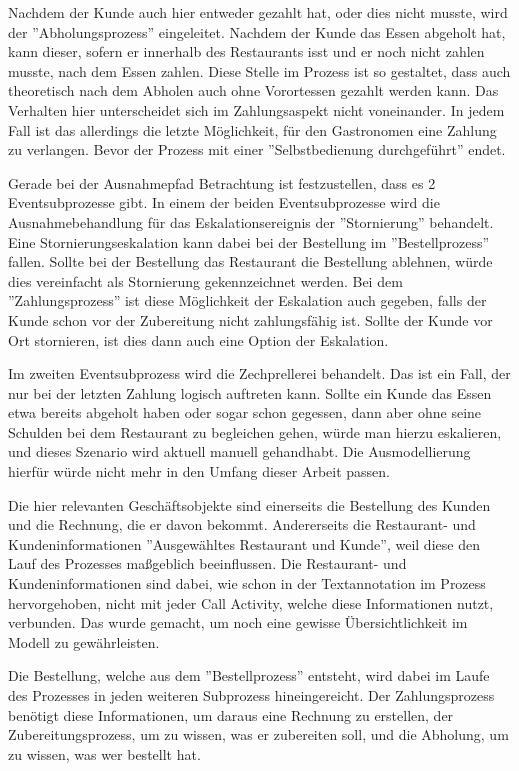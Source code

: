 Nachdem der Kunde auch hier entweder gezahlt hat, oder dies nicht musste, wird der ''Abholungsprozess'' eingeleitet. Nachdem der Kunde das Essen abgeholt hat, kann dieser, sofern er innerhalb des Restaurants isst und er noch nicht zahlen musste, nach dem Essen zahlen. Diese Stelle im Prozess ist so gestaltet, dass auch theoretisch nach dem Abholen auch ohne Vorortessen gezahlt werden kann. Das Verhalten hier unterscheidet sich im Zahlungsaspekt nicht voneinander. In jedem Fall ist das allerdings die letzte Möglichkeit, für den Gastronomen eine Zahlung zu verlangen. Bevor der Prozess mit einer ''Selbstbedienung durchgeführt'' endet.

Gerade bei der Ausnahmepfad Betrachtung ist festzustellen, dass es 2 Eventsubprozesse gibt. In einem der beiden Eventsubprozesse wird die Ausnahmebehandlung für das Eskalationsereignis der ''Stornierung'' behandelt. Eine Stornierungseskalation kann dabei bei der Bestellung im ''Bestellprozess'' fallen. Sollte bei der Bestellung das Restaurant die Bestellung ablehnen, würde dies vereinfacht als Stornierung gekennzeichnet werden. Bei dem ''Zahlungsprozess'' ist diese Möglichkeit der Eskalation auch gegeben, falls der Kunde schon vor der Zubereitung nicht zahlungsfähig ist. Sollte der Kunde vor Ort stornieren, ist dies dann auch eine Option der Eskalation.

Im zweiten Eventsubprozess wird die Zechprellerei behandelt. Das ist ein Fall, der nur bei der letzten Zahlung logisch auftreten kann. Sollte ein Kunde das Essen etwa bereits abgeholt haben oder sogar schon gegessen, dann aber ohne seine Schulden bei dem Restaurant zu begleichen gehen, würde man hierzu eskalieren, und dieses Szenario wird aktuell manuell gehandhabt. Die Ausmodellierung hierfür würde nicht mehr in den Umfang dieser Arbeit passen. 

Die hier relevanten Geschäftsobjekte sind einerseits die Bestellung des Kunden und die Rechnung, die er davon bekommt. Andererseits die Restaurant- und Kundeninformationen ''Ausgewähltes Restaurant und Kunde'', weil diese den Lauf des Prozesses maßgeblich beeinflussen. Die Restaurant- und Kundeninformationen sind dabei, wie schon in der Textannotation im Prozess hervorgehoben, nicht mit jeder Call Activity, welche diese Informationen nutzt, verbunden. Das wurde gemacht, um noch eine gewisse Übersichtlichkeit im Modell zu gewährleisten.

Die Bestellung, welche aus dem ''Bestellprozess'' entsteht, wird dabei im Laufe des Prozesses in jeden weiteren Subprozess hineingereicht. Der Zahlungsprozess benötigt diese Informationen, um daraus eine Rechnung zu erstellen, der Zubereitungsprozess, um zu wissen, was er zubereiten soll, und die Abholung, um zu wissen, was wer bestellt hat.

